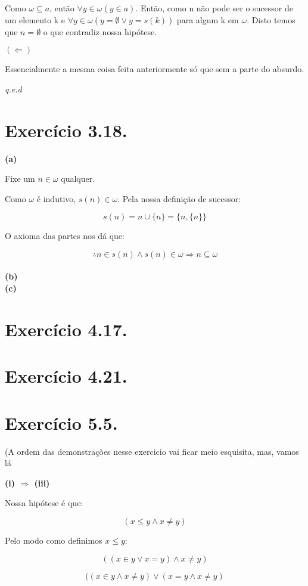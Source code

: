 \documentclass[12pt]{extarticle}
\newcommand{\fim}{\begin{flushright}

   \emph{q.e.d}
\end{flushright}}
\begin{document}
Como $\omega \subseteq a$, então $\forall y \in \omega (y \in a)$. Então, como n não pode ser o sucessor de um elemento k e $\forall y \in \omega (y = \emptyset \lor y = s(k))$ para algum k em $\omega$. Disto temos que $n = \emptyset$ o que contradiz nossa hipótese.

$(\Leftarrow)$ 

Essencialmente a mesma coisa feita anteriormente só que sem a parte do absurdo.

\fim

\section{Exercício 3.18.}

\textbf{(a)}

Fixe um $n \in \omega$ qualquer.

Como $\omega$ é indutivo, $s(n) \in \omega$. Pela nossa definição de sucessor:

$$
s(n) = n \cup \{n\} = \{n ,\{n\}\}
$$

O axioma das partes nos dá que:

$$
\therefore n \in s(n) \land s(n) \in \omega \Rightarrow n \subseteq \omega
$$
\\
\textbf{(b)}
\\
\textbf{(c)}

\section{Exercício 4.17.}

\section{Exercício 4.21.}

\section{Exercício 5.5.}

(A ordem das demonstrações nesse exercicio vai ficar meio esquisita, mas, vamos lá

\textbf{(i) $\Rightarrow$ (iii)}

Nossa hipótese é que:

$$
(x \leq y \land x \neq y)
$$

Pelo modo como definimos $x \leq y$:

$$
((x \in y \lor x = y) \land x \neq y)
$$

$$
((x \in y \land x \neq y) \lor (x = y \land x \neq y) 
$$
\end{document}
